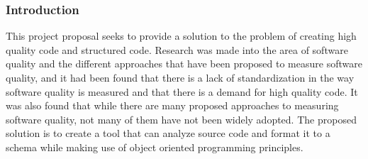 \subsubsection{Introduction} %
This project proposal seeks to provide a solution to the problem of creating high quality code and structured code. Research was made into the area of software quality and the different approaches that have been proposed to measure software quality, and it had been found that there is a lack of standardization in the way software quality is measured and that there is a demand for high quality code. It was also found that while there are many proposed approaches to measuring software quality, not many of them have not been widely adopted. The proposed solution is to create a tool that can analyze source code and format it to a schema while making use of object oriented programming principles.
